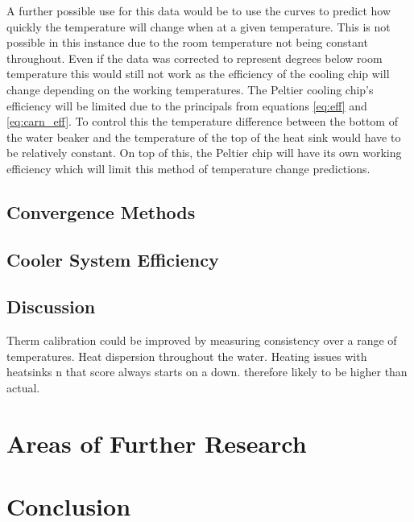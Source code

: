 \documentclass[10pt]{article}
\begin{document}
A further possible use for this data would be to use the curves to predict how quickly the temperature will change when at a given temperature. This is not possible in this instance due to the room temperature not being constant throughout. Even if the data was corrected to represent degrees below room temperature this would still not work as the efficiency of the cooling chip will change depending on the working temperatures. The Peltier cooling chip's efficiency will be limited due to the principals from equations \ref{eq:eff} and \ref{eq:carn_eff}. To control this the temperature difference between the bottom of the water beaker and the temperature of the top of the heat sink would have to be relatively constant. On top of this, the Peltier chip will have its own working efficiency which will limit this method of temperature change predictions.

\subsection*{Convergence Methods}
\subsection*{Cooler System Efficiency}


\subsection*{Discussion}
Therm calibration could be improved by measuring consistency over a range of temperatures.
Heat dispersion throughout the water.
Heating issues with heatsinks n that
score always starts on a down. therefore likely to be higher than actual.

\section*{Areas of Further Research}


\section*{Conclusion}






\newpage
\appendix
\end{document}
